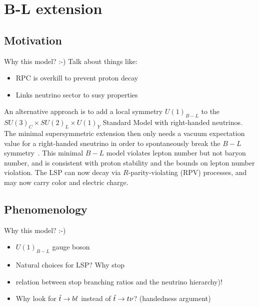 \section{B-L extension}
\label{sec:theory_bl_extension}


\subsection{Motivation}

{\color{red} Why this model? :-) Talk about things like:
\begin{itemize}
\item RPC is overkill to prevent proton decay
\item Links neutrino sector to susy properties
\end{itemize}
}

An alternative approach is to add a local symmetry $U(1)_{B-L}$ to the
$SU(3)_C \times SU(2)_L \times U(1)_Y$ Standard Model with right-handed
neutrinos.
The minimal supersymmetric extension then only needs a vacuum expectation value
for a right-handed sneutrino in order to spontaneously break the
$B-L$ symmetry~\cite{FileviezPerez:2008sx, Barger:2008wn, FileviezPerez:2009gr,
Everett:2009vy, Evans:1986ada, Lukas:1998yy, Braun:2005ux, Braun:2005nv,
Braun:2006ae, Ambroso:2009jd, Ambroso:2010pe, Ovrut:2012wg}.
This minimal $B-L$ model violates lepton number but not baryon number, and is
consistent with proton stability and the bounds on lepton number violation.
The LSP can now decay via $R$-parity-violating (RPV) processes, and may now
carry color and electric charge.

\subsection{Phenomenology}

{\color{red} Why this model? :-)
\begin{itemize}
\item $U(1)_{B-L}$ gauge boson
\item Natural choices for LSP? Why stop
\item relation between stop branching ratios and the neutrino hierarchy)!
\item Why look for $\tilde{t} \rightarrow b\ell$ instead of
  $\tilde{t} \rightarrow t\nu$? (handedness argument)
\end{itemize}
}

